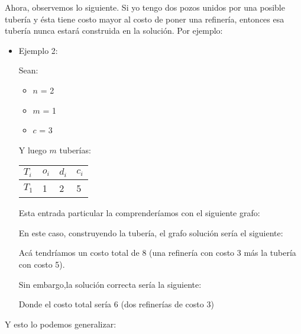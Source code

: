 Ahora, observemos lo siguiente. Si yo tengo dos pozos unidos por una posible tubería y ésta tiene costo mayor al costo de poner una refinería, entonces esa tubería nunca estará construida en la solución.
Por ejemplo:
\begin{itemize}
\item Ejemplo 2:

Sean:
\begin{itemize}
      \item $n$ = 2
      \item $m$ = 1
      \item $c$ = 3
\end{itemize}

Y luego $m$ tuberías:

\begin{table}[H]
\centering
\parbox{0.3\textwidth}{
    \begin{tabular}{ | l | l | l | l |}
    \hline
$T_{i}$ & $o_{i}$ & $d_{i}$ & $c_{i}$ \\ \hline
$T_{1}$ & 1 & 2 & 5 \\ \hline
    \end{tabular}
}
\end{table}

Esta entrada particular la comprenderíamos con el siguiente grafo:


En este caso, construyendo la tubería, el grafo solución sería el siguiente:


Acá tendríamos un costo total de 8 (una refinería con costo 3 más la tubería con costo 5).

Sin embargo,la solución correcta sería la siguiente:


Donde el costo total sería 6 (dos refinerías de costo 3)
\end{itemize}



Y esto lo podemos generalizar: \\

